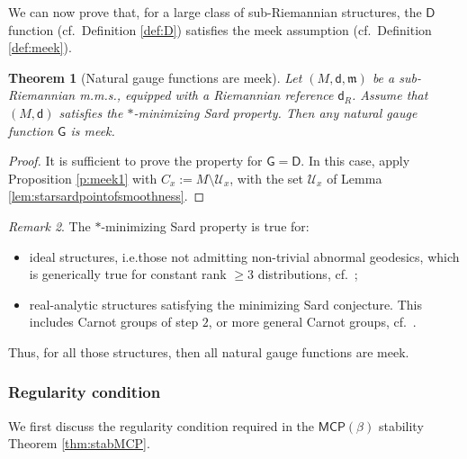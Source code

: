 \documentclass[11pt,a4paper]{article}
\theoremstyle{plain}
\newtheorem{theorem}{Theorem}[section]
\theoremstyle{definition}
\theoremstyle{remark}
\newtheorem{remark}[theorem]{Remark}
\numberwithin{equation}{section}
\newcommand{\MCP}{\mathsf{MCP}}
\newcommand{\mm}{\mathfrak m}
\newcommand{\sfd}{\mathsf d}
\newcommand{\sfD}{\mathsf D}
\newcommand{\sfG}{\mathsf G}
\begin{document}
We can now prove that, for a large class of sub-Riemannian structures, the $\sfD$ function (cf.\ Definition \ref{def:D}) satisfies the meek assumption (cf.\ Definition \ref{def:meek}).

\begin{theorem}[Natural gauge functions are meek]\label{t:meeknatural}
Let $(M,\sfd,\mm)$ be a sub-Riemannian m.m.s., equipped with a Riemannian reference $\sfd_R$. Assume that $(M,\sfd)$ satisfies the $*$-minimizing Sard property.  Then any natural gauge function $\sfG$ is meek.
\end{theorem}
\begin{proof}
It is sufficient to prove the property for $\sfG=\sfD$. In this case, apply Proposition \ref{p:meek1} with $C_x := M\setminus \mathcal{U}_x$, with the set $\mathcal{U}_x$ of Lemma \ref{lem:starsardpointofsmoothness}.
\end{proof}

\begin{remark}\label{rem:meekexamples}
The $*$-minimizing Sard property is true for:
\begin{itemize}
\item ideal structures, i.e.\@ those not admitting non-trivial abnormal geodesics, which is generically true for constant rank $\geq 3$ distributions, cf.\ \cite[Thm.\@ 2.8]{CJT-Genericity};
\item real-analytic structures satisfying the minimizing Sard conjecture. This includes Carnot groups of step $2$, or more general Carnot groups, cf.\ \cite[Thm.\@ 1.2]{SardProp}.
\end{itemize}
Thus, for all those structures, then all natural gauge functions are meek.
\end{remark}


\subsubsection{Regularity condition}\label{sec:regularityGExamples}

We first discuss the regularity condition required in the $\MCP(\beta)$ stability Theorem \ref{thm:stabMCP}.
\end{document}
